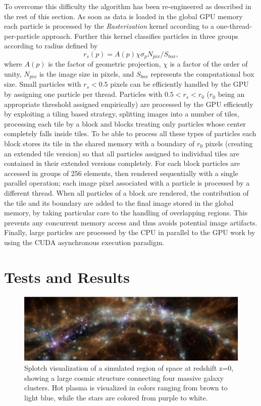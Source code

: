 To overcome this difficulty the algorithm has been re-engineered as described in the rest of this section. As soon as data is loaded in the global GPU memory each particle is processed by the {\it Rasterization} kernel according to a one-thread-per-particle approach. Further this kernel classifies particles in three groups according to radius defined by 
\begin{equation}\label{rad2}{r_s(p)}=A(p)\chi \sigma_p N_{pix}/ S_{box},
\end{equation}
where $A(p)$ is the factor of geometric projection, $\chi$ is a factor of the order of unity, $N_{pix}$ is the image size in pixels, and $S_{box}$ represents the computational box size. Small particles with $r_s < 0.5$ pixels can be efficiently handled by the GPU by assigning one particle per thread. Particles with $0.5<r_s<r_0$ ($r_0$ being an appropriate threshold assigned empirically) are processed by the GPU efficiently by exploiting a tiling based strategy, splitting images into a number of tiles, processing each tile by a block and blocks treating only particles whose center completely falls inside tiles. To be able to process all these types of particles each block stores its tile in the shared memory with a boundary of $r_0$ pixels (creating an extended tile version) so that all particles assigned to individual tiles are contained in their extended versions completely. For each block particles are accessed in groups of 256 elements, then rendered sequentially with a single parallel operation; each image pixel associated with a particle is processed by a different thread. When all particles of a block are rendered, the contribution of the tile and its boundary are added to the final image stored in the global memory, by taking particular care to the handling of overlapping regions. This prevents any concurrent memory access and thus avoids potential image artifacts. Finally, large particles are processed by the CPU in parallel to the GPU work by using the CUDA asynchronous execution paradigm.

\section{Tests and Results}

\begin{figure}
\centering
\includegraphics[scale=1.0]{part4/Gheller_P013/P013-1.eps}
\caption{Splotch visualization of a simulated region of space at redshift z=0, showing a large cosmic structure connecting four massive galaxy clusters. Hot plasma is visualized in colors ranging from brown to light blue, while the stars are colored from purple to white.}

\label{fig:box}
\end{figure}


